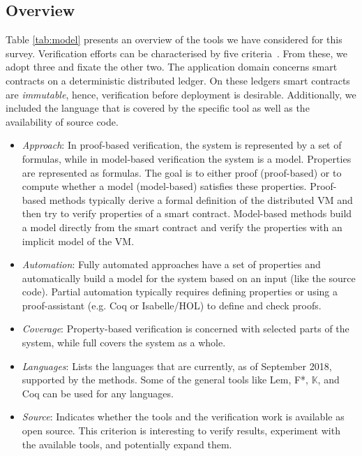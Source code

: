 \subsection{Overview}

Table \ref{tab:model} presents an overview of the tools we have considered for this survey.
Verification efforts can be characterised by five criteria~\cite[173]{Huth2004}. From these, we adopt three and fixate the other two. 
The application domain concerns smart contracts on a deterministic distributed ledger.
On these ledgers smart contracts are \emph{immutable}, hence, verification before deployment is desirable. 
Additionally, we included the language that is covered by the specific tool as well as the availability of source code.

\begin{itemize}
\item \emph{Approach}: In proof-based verification, the system is represented by a set of formulas, while in model-based verification the system is a model. Properties are represented as formulas. The goal is to either proof (proof-based) or to compute whether a model (model-based) satisfies these properties. Proof-based methods typically derive a formal definition of the distributed VM and then try to verify properties of a smart contract. Model-based methods build a model directly from the smart contract and verify the properties with an implicit model of the VM.
\item \emph{Automation}: Fully automated approaches have a set of properties and automatically build a model for the system based on an input (like the source code). Partial automation typically requires defining properties or using a proof-assistant (e.g. Coq or Isabelle/HOL) to define and check proofs.
\item \emph{Coverage}: Property-based verification is concerned with selected parts of the system, while full covers the system as a whole.
\item \emph{Languages}: Lists the languages that are currently, as of September 2018, supported by the methods. Some of the general tools like Lem, F*, $\mathbb{K}$, and Coq can be used for any languages.
\item \emph{Source}: Indicates whether the tools and the verification work is available as open source. This criterion is interesting to verify results, experiment with the available tools, and potentially expand them.
\end{itemize}


